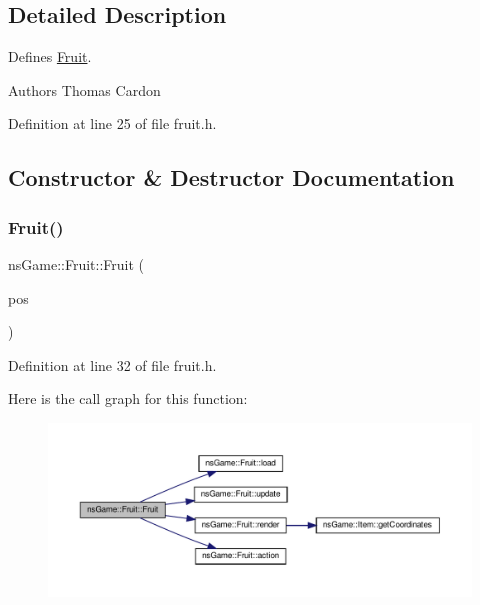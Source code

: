 \subsection{Detailed Description}
Defines \hyperlink{classns_game_1_1_fruit}{Fruit}. 

\begin{DoxyAuthor}{Authors}
Thomas Cardon 
\end{DoxyAuthor}


Definition at line 25 of file fruit.\+h.



\subsection{Constructor \& Destructor Documentation}
\mbox{\label{classns_game_1_1_fruit_a3d8e8a000d60e2d1f71ebd1820dd6667}} 
\subsubsection{\texorpdfstring{Fruit()}{Fruit()}}
{\footnotesize\ttfamily ns\+Game\+::\+Fruit\+::\+Fruit (\begin{DoxyParamCaption}\item[{ns\+Graphics\+::\+Vec2D}]{pos }\end{DoxyParamCaption})\hspace{0.3cm}{\ttfamily [inline]}}



Definition at line 32 of file fruit.\+h.

Here is the call graph for this function\+:\nopagebreak
\begin{figure}[H]
\begin{center}
\leavevmode
\includegraphics[width=350pt]{classns_game_1_1_fruit_a3d8e8a000d60e2d1f71ebd1820dd6667_cgraph}
\end{center}
\end{figure}


